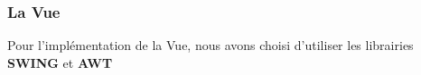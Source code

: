 \subsubsection{La Vue}
\label{subsubsec:vue}

Pour l'implémentation de la Vue, nous avons choisi d'utiliser les librairies \textbf{SWING} et \textbf{AWT}
